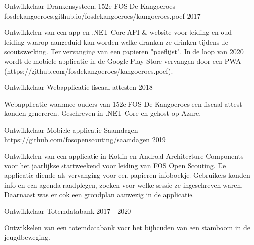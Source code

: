 


\begin{cventries}


\cventry
{Ontwikkelaar} %
{Drankensysteem 152e FOS De Kangoeroes} %
{fosdekangoeroes.github.io/fosdekangoeroes/kangoeroes.poef} %
{2017} %
{ 
\begin{cvitems}
\item {Ontwikkelen van een app en .NET Core API \& website voor leiding en oud-leiding waarop aangeduid kan worden welke dranken ze drinken tijdens de scoutswerking. Ter vervanging van een papieren "poeflijst". In de loop van 2020 wordt de mobiele applicatie in de Google Play Store vervangen door een PWA (https://github.com/fosdekangoeroes/kangoeroes.poef).}
\end{cvitems}
}

\cventry
{Ontwikkelaar} %
{Webapplicatie fiscaal attesten} %
{}
{2018} %
{ 
\begin{cvitems}
\item {Webapplicatie waarmee ouders van 152e FOS De Kangoeroes een fiscaal attest konden genereren. Geschreven in .NET Core en gehost op Azure.}
\end{cvitems}
}

\cventry
{Ontwikkelaar} %
{Mobiele applicatie Saamdagen} %
{https://github.com/fosopenscouting/saamdagen}
{2019} %
{ 
\begin{cvitems}
\item {Ontwikkelen van een applicatie in Kotlin en Android Architecture Components voor het jaarlijkse startweekend voor leiding van FOS Open Scouting. De applicatie diende als vervanging voor een papieren infoboekje. Gebruikers konden info en een agenda raadplegen, zoeken voor welke sessie ze ingeschreven waren. Daarnaast was er ook een grondplan aanwezig in de applicatie.}
\end{cvitems}
}

\cventry
{Ontwikkelaar}
{Totemdatabank}
{}
{2017 - 2020}
{
    \begin{cvitems}
        \item{Ontwikkelen van een totemdatabank voor het bijhouden van een stamboom in de jeugdbeweging.}
    \end{cvitems}
    
}


\end{cventries}